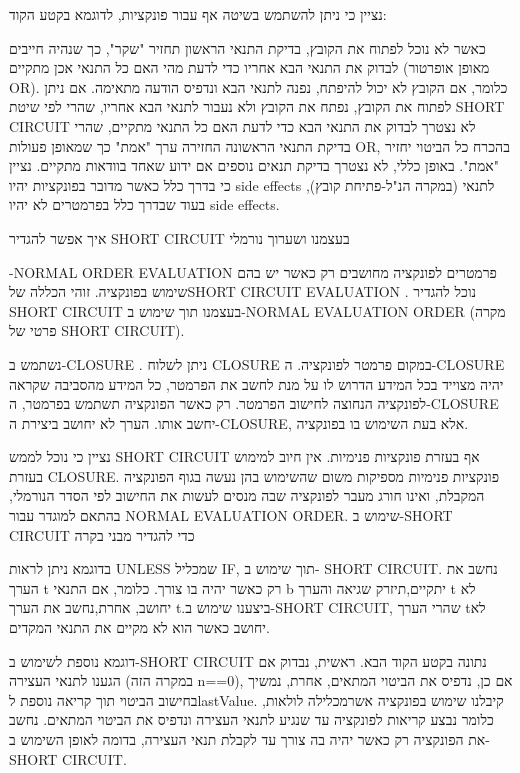         נציין כי ניתן להשתמש בשיטה אף עבור פונקציות, לדוגמא בקטע הקוד:

        כאשר לא נוכל לפתוח את הקובץ, בדיקת התנאי הראשון תחזיר "שקר", כך שנהיה חייבים
        לבדוק את התנאי הבא אחריו כדי לדעת מהי האם כל התנאי אכן מתקיים (מאופן אופרטור
        OR). כלומר, אם הקובץ לא יכול להיפתח, נפנה לתנאי הבא ונדפיס הודעה מתאימה. אם
        ניתן לפתוח את הקובץ, נפתח את הקובץ ולא נעבור לתנאי הבא אחריו, שהרי לפי שיטת
        SHORT CIRCUIT לא נצטרך לבדוק את התנאי הבא כדי לדעת האם כל התנאי מתקיים, שהרי
        בדיקת התנאי הראשונה החזירה ערך "אמת" כך שמאופן פעולות OR, בהכרח כל הביטוי
        יחזיר "אמת". באופן כללי, לא נצטרך בדיקת תנאים נוספים אם ידוע שאחד בוודאות
        מתקיים. נציין כי בדרך כלל כאשר מדובר בפונקציות יהיו side effects לתנאי
        (במקרה הנ"ל-פתיחת קובץ), בעוד שבדרך כלל בפרמטרים לא יהיו side effects.

        איך אפשר להגדיר SHORT CIRCUIT בעצמנו ושערוך נורמלי

        -NORMAL ORDER EVALUATION פרמטרים לפונקציה מחושבים רק כאשר יש בהם שימוש
        בפונקציה. זוהי הכללה שלSHORT CIRCUIT EVALUATION . נוכל להגדיר SHORT CIRCUIT
        בעצמנו תוך שימוש ב-NORMAL EVALUATION ORDER (מקרה פרטי של SHORT CIRCUIT).

        נשתמש ב-CLOSURE . ניתן לשלוח CLOSURE במקום פרמטר לפונקציה. ה-CLOSURE יהיה
        מצוייד בכל המידע הדרוש לו על מנת לחשב את הפרמטר, כל המידע מהסביבה שקראה
        לפונקציה הנחוצה לחישוב הפרמטר. רק כאשר הפונקציה תשתמש בפרמטר, ה-CLOSURE יחשב
        אותו. הערך לא יחושב ביצירת ה-CLOSURE, אלא בעת השימוש בו בפונקציה.

        נציין כי נוכל לממש SHORT CIRCUIT אף בעזרת פונקציות פנימיות. אין חיוב למימוש
        בעזרת CLOSURE. פונקציות פנימיות מספיקות משום שהשימוש בהן נעשה בגוף הפונקציה
        המקבלת, ואינו חורג מעבר לפונקציה שבה מנסים לעשות את החישוב לפי הסדר הנורמלי,
        בהתאם למוגדר עבור NORMAL EVALUATION ORDER. שימוש ב-SHORT CIRCUIT כדי להגדיר
        מבני בקרה

        בדוגמא ניתן לראות UNLESS שמכליל IF, תוך שימוש ב- SHORT CIRCUIT. נחשב את הערך
        t רק כאשר יהיה בו צורך. כלומר, אם התנאי b יתקיים,תיזרק שגיאה והערך t לא יחושב,
        אחרת,נחשב את הערך t.ביצענו שימוש ב-SHORT CIRCUIT, שהרי הערך tלא יחושב כאשר הוא
        לא מקיים את התנאי המקדים.

        דוגמא נוספת לשימוש ב-SHORT CIRCUIT נתונה בקטע הקוד הבא. ראשית, נבדוק אם הגענו
        לתנאי העצירה (במקרה הזה n==0), אם כן, נדפיס את הביטוי המתאים, אחרת, נמשיך
        בחישוב הביטוי תוך קריאה נוספת לlastValue. קיבלנו שימוש בפונקציה אשרמכלילה
        לולאות, כלומר נבצע קריאות לפונקציה עד שנגיע לתנאי העצירה ונדפיס את הביטוי
        המתאים. נחשב את הפונקציה רק כאשר יהיה בה צורך עד לקבלת תנאי העצירה, בדומה לאופן
        השימוש ב-SHORT CIRCUIT.


